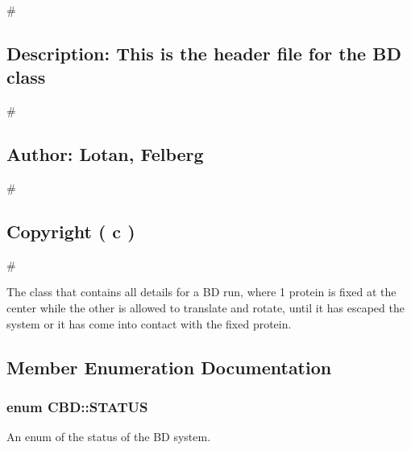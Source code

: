 \# \subsection*{Description\-: This is the header file for the B\-D class}

\# \subsection*{Author\-: Lotan, Felberg}

\# \subsection*{Copyright ( c )}

\#

\begin{DoxyVerb}    The class that contains all details for a BD run, where 1 protein is fixed
    at the center while the other is allowed to translate and rotate, until it has
    escaped the system or it has come into contact with the fixed protein.\end{DoxyVerb}
 

\subsection{Member Enumeration Documentation}
\hypertarget{classCBD_ad133262cc326c96e755511655e632e57}{
\subsubsection[{S\-T\-A\-T\-U\-S}]{\setlength{\rightskip}{0pt plus 5cm}enum {\bf C\-B\-D\-::\-S\-T\-A\-T\-U\-S}}}\label{classCBD_ad133262cc326c96e755511655e632e57}


An enum of the status of the B\-D system. 

